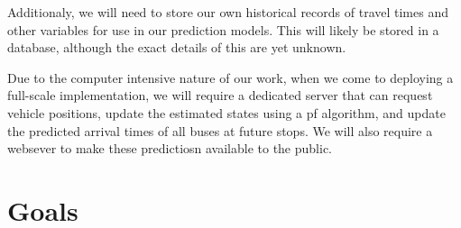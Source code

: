 \documentclass[12pt,a4paper]{article}
\begin{document}
Additionaly, we will need to store our own historical records of travel times and other
variables for use in our prediction models. 
This will likely be stored in a database, although the exact details of this are yet unknown.


Due to the computer intensive nature of our work, when we come to deploying a full-scale implementation,
we will require a dedicated server that can request vehicle positions,
update the estimated states using a \gls{pf} algorithm,
and update the predicted arrival times of all buses at future stops.
We will also require a websever to make these predictiosn available to the public.











\section{Goals}







\end{document}
